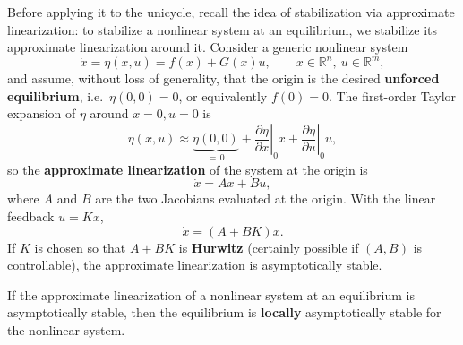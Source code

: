 Before applying it to the unicycle, recall the idea of stabilization
via approximate linearization: to stabilize a nonlinear system at an
equilibrium, we stabilize its approximate linearization around it.
Consider a generic nonlinear system
\[
\dot{x} = \eta(x, u) = f(x) + G(x) u,
\qquad x \in \mathbb{R}^n,\ u \in \mathbb{R}^m,
\]
and assume, without loss of generality, that the origin is the desired
\textbf{unforced equilibrium}, i.e.\ \( \eta(0, 0) = 0 \), or
equivalently \( f(0) = 0 \). The first-order Taylor expansion of
\( \eta \) around \( x = 0, u = 0 \) is
\[
\eta(x, u) \approx \underbrace{\eta(0, 0)}_{=\,0}
    + \left. \frac{\partial \eta}{\partial x} \right|_{0}
      x
    + \left. \frac{\partial \eta}{\partial u} \right|_{0}
      u,
\]
so the \textbf{approximate linearization} of the system at the origin is
\[
\dot{x} = A x + B u,
\]
where \( A \) and \( B \) are the two Jacobians evaluated at the
origin. With the linear feedback \( u = K x \),
\[
\dot{x} = (A + BK) x.
\]
If \( K \) is chosen so that \( A + BK \) is \textbf{Hurwitz}
(certainly possible if \( (A, B) \) is controllable), the approximate
linearization is asymptotically stable.

\begin{theorem}
\label{thm:lyapunov-indirect}
If the approximate linearization of a nonlinear system at an
equilibrium is asymptotically stable, then the equilibrium is
\textbf{locally} asymptotically stable for the nonlinear system.
\end{theorem}

